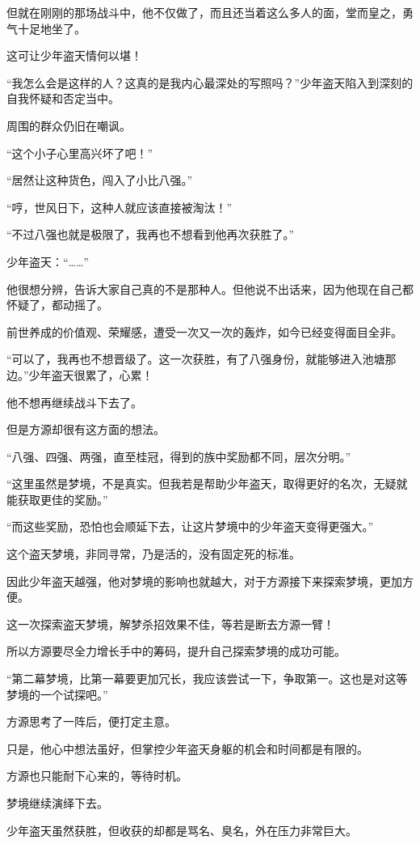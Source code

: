 \begin{this_body}
但就在刚刚的那场战斗中，他不仅做了，而且还当着这么多人的面，堂而皇之，勇气十足地坐了。

这可让少年盗天情何以堪！

“我怎么会是这样的人？这真的是我内心最深处的写照吗？”少年盗天陷入到深刻的自我怀疑和否定当中。

周围的群众仍旧在嘲讽。

“这个小子心里高兴坏了吧！”

“居然让这种货色，闯入了小比八强。”

“哼，世风日下，这种人就应该直接被淘汰！”

“不过八强也就是极限了，我再也不想看到他再次获胜了。”

少年盗天：“……”

他很想分辨，告诉大家自己真的不是那种人。但他说不出话来，因为他现在自己都怀疑了，都动摇了。

前世养成的价值观、荣耀感，遭受一次又一次的轰炸，如今已经变得面目全非。

“可以了，我再也不想晋级了。这一次获胜，有了八强身份，就能够进入池塘那边。”少年盗天很累了，心累！

他不想再继续战斗下去了。

但是方源却很有这方面的想法。

“八强、四强、两强，直至桂冠，得到的族中奖励都不同，层次分明。”

“这里虽然是梦境，不是真实。但我若是帮助少年盗天，取得更好的名次，无疑就能获取更佳的奖励。”

“而这些奖励，恐怕也会顺延下去，让这片梦境中的少年盗天变得更强大。”

这个盗天梦境，非同寻常，乃是活的，没有固定死的标准。

因此少年盗天越强，他对梦境的影响也就越大，对于方源接下来探索梦境，更加方便。

这一次探索盗天梦境，解梦杀招效果不佳，等若是断去方源一臂！

所以方源要尽全力增长手中的筹码，提升自己探索梦境的成功可能。

“第二幕梦境，比第一幕要更加冗长，我应该尝试一下，争取第一。这也是对这等梦境的一个试探吧。”

方源思考了一阵后，便打定主意。

只是，他心中想法虽好，但掌控少年盗天身躯的机会和时间都是有限的。

方源也只能耐下心来的，等待时机。

梦境继续演绎下去。

少年盗天虽然获胜，但收获的却都是骂名、臭名，外在压力非常巨大。


\end{this_body}
